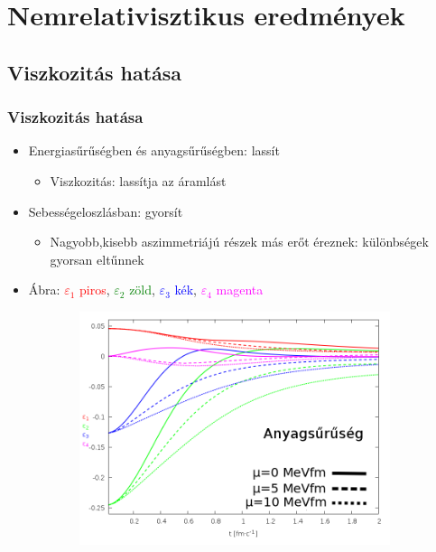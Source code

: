 \documentclass{beamer}
\begin{document}
\section{Nemrelativisztikus eredmények}

\subsection{Viszkozitás hatása}
\begin{frame}
\frametitle{Viszkozitás hatása}
\begin{center}
\begin{itemize}
  \setlength{\itemsep}{2pt}

\item<1-> Energiasűrűségben és  anyagsűrűségben: lassít
\begin{itemize}
\item<1-> Viszkozitás: lassítja az áramlást
\end{itemize}
\item<1-> Sebességeloszlásban: gyorsít
\begin{itemize}
\item<1-> Nagyobb,kisebb aszimmetriájú részek más erőt éreznek: különbségek gyorsan eltűnnek
\end{itemize}
\item Ábra: \large{\textcolor{red}{$\varepsilon_1$ piros}, \textcolor{green}{$\varepsilon_2$ zöld}, \textcolor{blue}{$\varepsilon_3$ kék},  \textcolor{magenta}{$\varepsilon_4$ magenta}}
\end{itemize}
\begin{figure}[H]
	\centering
    \begin{subfigure}[b]{0.49\textwidth}
    		\includegraphics[width=\textwidth]{pic/res/nonrel/eps_visc_r}

\end{subfigure}
\end{figure}
\end{center}
\end{frame}
\end{document}
